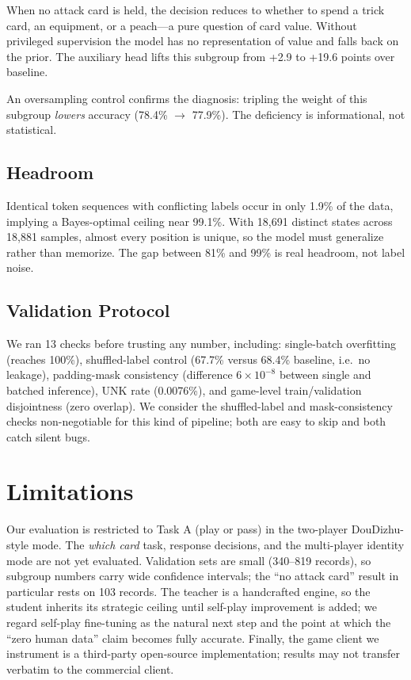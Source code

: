 \documentclass[11pt]{article}
\begin{document}
When no attack card is held, the decision reduces to whether to spend a trick card, an equipment, or a peach---a pure question of card value. Without privileged supervision the model has no representation of value and falls back on the prior. The auxiliary head lifts this subgroup from +2.9 to +19.6 points over baseline.

An oversampling control confirms the diagnosis: tripling the weight of this subgroup \emph{lowers} accuracy (78.4\% $\to$ 77.9\%). The deficiency is informational, not statistical.

\subsection{Headroom}

Identical token sequences with conflicting labels occur in only 1.9\% of the data, implying a Bayes-optimal ceiling near 99.1\%. With 18,691 distinct states across 18,881 samples, almost every position is unique, so the model must generalize rather than memorize. The gap between 81\% and 99\% is real headroom, not label noise.

\subsection{Validation Protocol}

We ran 13 checks before trusting any number, including: single-batch overfitting (reaches 100\%), shuffled-label control (67.7\% versus 68.4\% baseline, i.e.\ no leakage), padding-mask consistency (difference $6\times10^{-8}$ between single and batched inference), UNK rate (0.0076\%), and game-level train/validation disjointness (zero overlap). We consider the shuffled-label and mask-consistency checks non-negotiable for this kind of pipeline; both are easy to skip and both catch silent bugs.

\section{Limitations}

Our evaluation is restricted to Task A (play or pass) in the two-player DouDizhu-style mode. The \emph{which card} task, response decisions, and the multi-player identity mode are not yet evaluated. Validation sets are small (340--819 records), so subgroup numbers carry wide confidence intervals; the ``no attack card'' result in particular rests on 103 records. The teacher is a handcrafted engine, so the student inherits its strategic ceiling until self-play improvement is added; we regard self-play fine-tuning as the natural next step and the point at which the ``zero human data'' claim becomes fully accurate. Finally, the game client we instrument is a third-party open-source implementation; results may not transfer verbatim to the commercial client.
\end{document}
